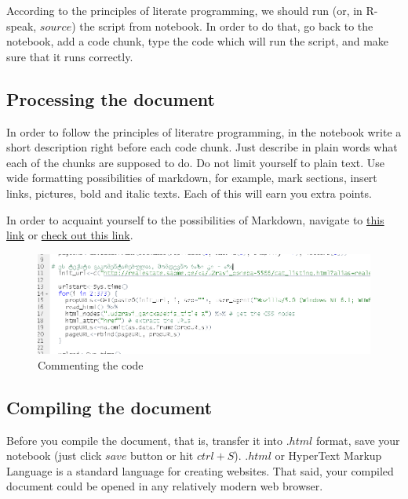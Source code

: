 \documentclass{article}\usepackage[]{graphicx}\usepackage[]{color}
\begin{document}
According to the principles of literate programming, we should run (or, in R-speak, $source$) the script from notebook. In order to do that, go back to the notebook, add a code chunk, type the code which will run the script, and make sure that it runs correctly.

\subsection*{Processing the document}

In order to follow the principles of literatre programming, in the notebook write a short description right before each code chunk. Just describe in plain words what each of the chunks are supposed to do. Do not limit yourself to plain text. Use wide formatting possibilities of markdown, for example, mark sections, insert links, pictures, bold and italic texts. Each of this will earn you extra points.

In order to acquaint yourself to the possibilities of Markdown, navigate to \href{https://www.rstudio.com/wp-content/uploads/2016/03/rmarkdown-cheatsheet-2.0.pdf}{this link} or  \href{https://github.com/adam-p/markdown-here/wiki/Markdown-Cheatsheet}{check out this link}.

\begin{figure}[h]
\centering
\includegraphics[width=\textwidth]{img/commented.PNG}
\caption{Commenting the code}
    \label{comment}
\end{figure}



\subsection*{Compiling the document}

Before you compile the document, that is, transfer it into $.html$ format, save your notebook (just click $save$ button or hit $ctrl+S$). $.html$ or HyperText Markup Language is a standard language for creating websites. That said, your compiled document could be opened in any relatively modern web browser.
\end{document}
